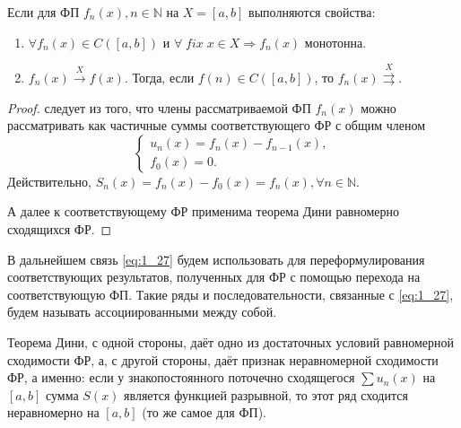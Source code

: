 \begin{consequence}
	Если для ФП $f_n(x), n \in \mathbb{N}$ на $X = [a,b]$ выполняются свойства:
	\begin{enumerate}
		\item $\forall f_n(x) \in C([a,b])$ и $\forall \; fix \; x \in X \Rightarrow f_n(x)$ монотонна.
		\item $f_n(x) 	\overset{X}{\longrightarrow}f(x)$. Тогда, если $f(n) \in C([a,b])$, то $f_n(x) \overset{X}{\rightrightarrows}$.
	\end{enumerate}
\end{consequence}
\begin{proof}
	следует из того, что члены рассматриваемой ФП $f_n(x)$ можно рассматривать как частичные суммы соответствующего ФР с общим членом
	\begin{equation}
	\label{eq:1_27}
	\begin{cases}
	u_n(x) = f_n(x) - f_{n-1}(x),\\
	f_0(x) = 0.
	\end{cases}
	\end{equation}
	Действительно, $S_n(x) = f_n(x) - f_0(x) = f_n(x), \forall n \in \mathbb{N}$.

	А далее к соответствующему ФР применима теорема Дини равномерно сходящихся ФР.
\end{proof}
\begin{notes}
	\item В дальнейшем связь \eqref{eq:1_27} будем использовать для переформулирования соответствующих результатов, полученных для ФР с помощью перехода на соответствующую ФП. Такие ряды и последовательности, связанные с \eqref{eq:1_27}, будем называть ассоциированными между собой.
	\item Теорема Дини, с одной стороны, даёт одно из достаточных условий равномерной сходимости ФР, а, с другой стороны, даёт признак неравномерной сходимости ФР, а именно: если у знакопостоянного поточечно сходящегося $\sum u_n(x)$ на $[a,b]$ сумма $S(x)$ является функцией разрывной, то этот ряд сходится неравномерно на $[a,b]$  (то же самое для ФП).
\end{notes}
